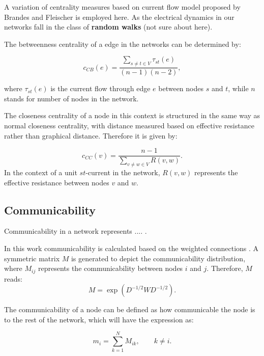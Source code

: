 \documentclass[%
 reprint,
 amsmath,amssymb,
 aps,
]{revtex4-2}
\begin{document}
A variation of centrality measures based on current flow model proposed by Brandes and Fleischer \cite{Brandes2005} is employed here. As the electrical dynamics in our networks fall in the class of \textbf{random walks} (not sure about here).

The betweenness centrality of a edge in the networks can be determined by:

\begin{equation}
c_{CB}(e) = \frac{\sum \limits_{s \neq t \in V}\tau_{st}(e)}{(n-1)(n-2)},
\label{eq:ebc}
\end{equation}



where $\tau_{st}(e)$ is the current flow through edge $e$ between nodes $s$ and $t$, while $n$ stands for number of nodes in the network.

The closeness centrality of a node in this context is structured in the same way as normal closeness centrality, with distance measured based on effective resistance rather than graphical distance. Therefore it is given by:

\begin{equation}
c_{CC}(v) = \frac{n-1}{\sum \limits_{v \neq w \in V} R(v,w)}.
\end{equation}
In the context of a unit $st$-current in the network, $R(v,w)$ represents the effective resistance between nodes $v$ and $w$.

\subsection{\label{sec:level2} Communicability}
Communicability in a network represents .... \cite{Estrada2008}. 

In this work communicability is calculated based on the weighted connections \cite{Crofts2009}. A symmetric matrix $M$ is generated to depict the communicability distribution, where $M_{ij}$ represents the communicability between nodes $i$ and $j$. Therefore, $M$ reads:
\begin{equation}
M = \exp{(D^{-1/2} W D^{-1/2})}.
\end{equation} 

The communicability of a node can be defined as how communicable the node is to the rest of the network, which will have the expression as:

\begin{equation}
	m_i = \sum \limits_{k = 1}^N M_{ik}, \qquad k \neq i.
\end{equation}
\end{document}
